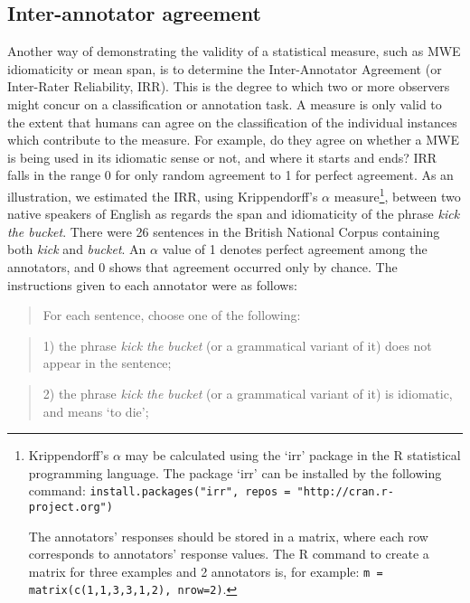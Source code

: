 \documentclass[output=paper]{langsci/langscibook}
\begin{document}
\subsection{Inter-annotator agreement}

Another way of demonstrating the validity of a statistical measure, such
as MWE idiomaticity or mean span, is to determine the  Inter-Annotator
Agreement (or Inter-Rater Reliability, IRR). This is the degree to
which two or more observers might concur on a classification or
annotation task. A measure is only valid to the extent that humans can
agree on the classification of the individual instances which
contribute to the measure. For example, do they agree on whether a MWE
is being used in its idiomatic sense or not, and where it starts and
ends? IRR falls in the range 0 for only random agreement to 1 for
perfect agreement. As an illustration, we estimated the IRR, using
Krippendorff’s $\alpha$ measure\footnote{Krippendorff’s $\alpha$ may be
calculated using the ‘irr’ package in the R statistical programming
language. The package ‘irr’ can be installed by the following
command: \texttt{install.packages("irr", repos = "http://cran.r-project.org")}

The annotators’
responses should be stored in a matrix, where each row corresponds to
annotators' response values. The R command to create a matrix for three
examples and 2 annotators is, for example: \texttt{m = matrix(c(1,1,3,3,1,2), nrow=2)}.
}, between two native speakers of English
as regards the span and idiomaticity of the phrase \textit{kick the bucket}.
There were 26 sentences in the British National Corpus containing both
\textit{kick} and \textit{bucket}. An $\alpha$ value of 1 denotes perfect agreement
among the annotators, and 0 shows that agreement occurred only by
chance. The instructions given to each annotator were as follows:


\begin{quotation}
For each sentence, choose one of the following:
\end{quotation}

\begin{quotation}
1) the phrase \textit{kick the bucket} (or a grammatical variant of it) does
not appear in the sentence;
\end{quotation}

\begin{quotation}
2) the phrase \textit{kick the bucket} (or a grammatical variant of it) is
idiomatic, and means `to die';
\end{quotation}
\end{document}
